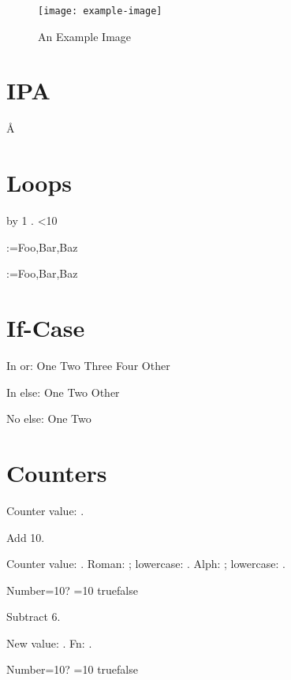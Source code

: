 \documentclass{article}
\begin{document}
\begin{figure}[htbp]
\centering
 \texttt{[image: example-image]}
 \caption{An Example Image}
 \label{fig:sample}
\end{figure}

\section{IPA}\label{sec:ipa}
 \AA {}
\textschwa

\section{Loops}

\newcount\myctr
\loop
 \advance\myctr by 1\relax
 \the\myctr.
\ifnum\myctr<10
\repeat

\makeatletter
\@for\tmp:=Foo,Bar,Baz

\def\tmplist{Foo,Bar,Baz}
\@for\tmp:=\tmplist{}
\makeatother

\section{If-Case}

\relax
In or:
\ifcase\myctr
 One%
 \or 
 Two%
 \or
 Three%
 \or
 Four%
 \else
 Other%
\fi

In else:
\ifcase\myctr
 One%
 \or 
 Two%
 \else
 Other%
\fi

No else:
\ifcase\myctr
 One%
 \or 
 Two%
\fi

\section{Counters}

Counter value: \themycounter.

Add 10.
\addtocounter{mycounter}{10}
Counter value: \themycounter.
Roman: ; lowercase: .
Alph: ; lowercase: .

Number=10? \ifnum\value{mycounter}=10 true\else false\fi

Subtract 6.
\addtocounter{mycounter}{-6}
New value: .
Fn: .

Number=10? \ifnum\value{mycounter}=10 true\else false\fi



\end{document}
